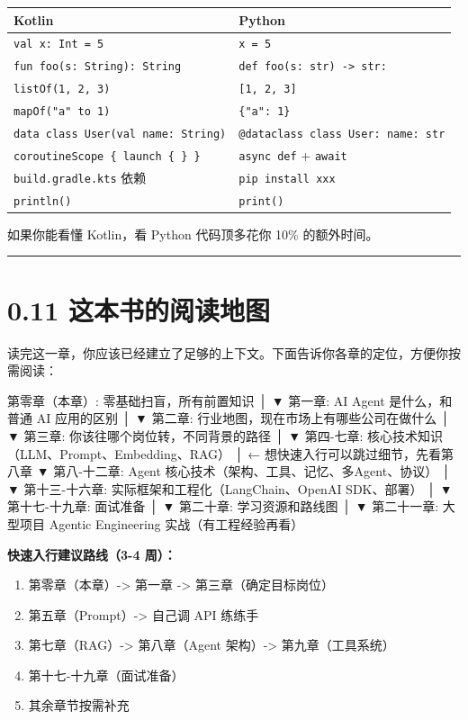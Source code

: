 \begingroup
\scriptsize
\setlength{\tabcolsep}{3pt}
\begin{longtable}{|p{}|p{}|}
\hline
Kotlin & Python \\ \hline
\texttt{val x: Int = 5} & \texttt{x = 5} \\ \hline
\texttt{fun foo(s: String): String} & \texttt{def foo(s: str) -> str:} \\ \hline
\texttt{listOf(1, 2, 3)} & \texttt{[1, 2, 3]} \\ \hline
\texttt{mapOf("a" to 1)} & \texttt{\{"a": 1\}} \\ \hline
\texttt{data class User(val name: String)} & \texttt{@dataclass class User: name: str} \\ \hline
\texttt{coroutineScope \{ launch \{ \} \}} & \texttt{async def} + \texttt{await} \\ \hline
\texttt{build.gradle.kts} 依赖 & \texttt{pip install xxx} \\ \hline
\texttt{println()} & \texttt{print()} \\ \hline
\end{longtable}
\endgroup

如果你能看懂 Kotlin，看 Python 代码顶多花你 10\% 的额外时间。


\bigskip\hrule\bigskip

\section{0.11 这本书的阅读地图}

读完这一章，你应该已经建立了足够的上下文。下面告诉你各章的定位，方便你按需阅读：


\begin{codeblock}
第零章（本章）: 零基础扫盲，所有前置知识
    │
    ▼
第一章: AI Agent 是什么，和普通 AI 应用的区别
    │
    ▼
第二章: 行业地图，现在市场上有哪些公司在做什么
    │
    ▼
第三章: 你该往哪个岗位转，不同背景的路径
    │
    ▼
第四-七章: 核心技术知识（LLM、Prompt、Embedding、RAG）
    │      ← 想快速入行可以跳过细节，先看第八章
    ▼
第八-十二章: Agent 核心技术（架构、工具、记忆、多Agent、协议）
    │
    ▼
第十三-十六章: 实际框架和工程化（LangChain、OpenAI SDK、部署）
    │
    ▼
第十七-十九章: 面试准备
    │
    ▼
第二十章: 学习资源和路线图
    │
    ▼
第二十一章: 大型项目 Agentic Engineering 实战（有工程经验再看）
\end{codeblock}

\textbf{快速入行建议路线（3-4 周）：}

\begin{enumerate}[leftmargin=2em]
\item 第零章（本章）-> 第一章 -> 第三章（确定目标岗位）
\item 第五章（Prompt）-> 自己调 API 练练手
\item 第七章（RAG）-> 第八章（Agent 架构）-> 第九章（工具系统）
\item 第十七-十九章（面试准备）
\item 其余章节按需补充
\end{enumerate}

